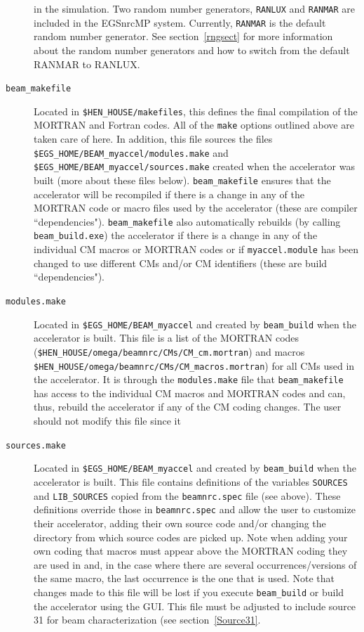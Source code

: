 \documentclass[12pt,twoside]{article}
\begin{document}
\begin{description}
in the simulation.  Two random number generators, {\tt RANLUX} and
{\tt RANMAR} are included in the EGSnrcMP system.  Currently,
{\tt RANMAR} is the default random
number generator.  See section~\ref{rngsect} for more information about
the random number generators and how to switch from the default RANMAR
to RANLUX.
\item[{\tt beam\_makefile}] Located in {\tt \$HEN\_HOUSE/makefiles}, this defines
the final compilation of the MORTRAN and Fortran codes.  All of the
{\tt make} options outlined above are taken care of here.  In addition,
this file sources the files\\ {\tt \$EGS\_HOME/BEAM\_myaccel/modules.make}
and {\tt \$EGS\_HOME/BEAM\_myaccel/sources.make} created when the accelerator
was built (more about these files below).  {\tt beam\_makefile} ensures
that the accelerator will be recompiled if there is a change in any of
the MORTRAN code or macro files used by the accelerator (these are
compiler ``dependencies").  {\tt beam\_makefile} also automatically rebuilds
(by calling {\tt beam\_build.exe}) the accelerator if there is a change
in any of the individual CM macros or MORTRAN codes or if {\tt myaccel.module}
has been changed to use different CMs and/or CM identifiers (these
are build ``dependencies").
\item[{\tt modules.make}] Located in {\tt \$EGS\_HOME/BEAM\_myaccel} and
created by {\tt beam\_build} when the accelerator is built.  This file
is a list of the MORTRAN codes\\
({\tt \$HEN\_HOUSE/omega/beamnrc/CMs/CM\_cm.mortran}) and macros\\
{\tt \$HEN\_HOUSE/omega/beamnrc/CMs/CM\_macros.mortran}) for all CMs used in
the accelerator.  It is through the {\tt modules.make} file that
{\tt beam\_makefile} has access to the individual CM macros and MORTRAN codes
and can, thus, rebuild the accelerator if any of the CM coding changes.
The user should not modify this file since it
\item[{\tt sources.make}] Located in {\tt \$EGS\_HOME/BEAM\_myaccel} and
created by {\tt beam\_build} when the accelerator is built.  This file
contains definitions of the variables {\tt SOURCES} and
{\tt LIB\_SOURCES} copied from the {\tt beamnrc.spec} file (see above).
These definitions override those in {\tt beamnrc.spec} and allow the user
to customize their accelerator, adding their own source code and/or changing the
directory from which source codes are picked up.
Note when adding your own coding that macros must appear above
the MORTRAN coding they are used in and, in the case where there are several
occurrences/versions of the same macro, the last occurrence is the one
that is used. Note that changes made to this file will be lost if you
execute {\tt beam\_build} or build the accelerator using the GUI. This file
must be adjusted to include source 31 for beam characterization (see
section~\ref{Source31}.
\end{description}
\end{document}
